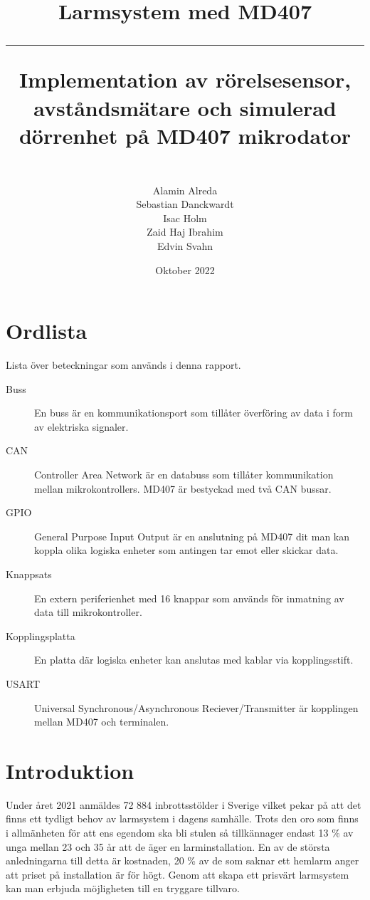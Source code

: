 \documentclass{article}
\title{\textbf{Larmsystem med MD407}\\ 
     \hspace{10cm}
     \hrule
    \hspace{10cm}
    Implementation av rörelsesensor, avståndsmätare och simulerad dörrenhet på MD407 mikrodator}
\author{\\Alamin Alreda\\Sebastian Danckwardt\\Isac Holm\\Zaid Haj Ibrahim\\Edvin Svahn}
\date{Oktober 2022}
\begin{document}
\maketitle
\newpage
\tableofcontents
\newpage
\section*{Ordlista}
Lista över beteckningar som används i denna rapport.
\begin{description}

\item[Buss] En buss är en kommunikationsport som tillåter överföring av data i form av elektriska signaler.

\item[CAN] Controller Area Network är en databuss som tillåter kommunikation mellan mikrokontrollers. MD407 är bestyckad med två CAN bussar.

\item[GPIO] General Purpose Input Output är en anslutning på MD407 dit man kan koppla olika logiska enheter som antingen tar emot eller skickar data.

\item[Knappsats] En extern periferienhet med 16 knappar som används för inmatning av data till mikrokontroller.

\item[Kopplingsplatta] En platta där logiska enheter kan anslutas med kablar via kopplingsstift.

\item[USART] Universal Synchronous/Asynchronous Reciever/Transmitter är kopplingen mellan MD407 och terminalen.

\end{description}
 \newpage

\setcounter{page}{1}
\section{Introduktion}

Under året 2021 anmäldes 72 884 inbrottsstölder i Sverige vilket pekar på att det finns ett tydligt behov av larmsystem i dagens samhälle.\cite{BRa} Trots den oro som finns i allmänheten för att ens egendom ska bli stulen så tillkännager endast 13 \% av unga mellan 23 och 35 år att de äger en larminstallation.\cite{MoFor} En av de största anledningarna till detta är kostnaden, 20 \% av de som saknar ett hemlarm anger att priset på installation är för högt.\cite{MoFor} Genom att skapa ett prisvärt larmsystem kan man erbjuda möjligheten till en tryggare tillvaro.
\end{document}
